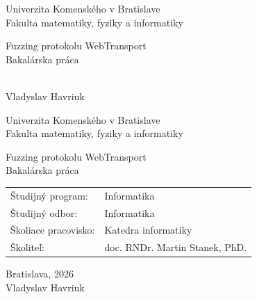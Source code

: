 \documentclass[12pt, twoside, openany]{book}
\def\mfrok{2026}
\def\mfnazov{Fuzzing protokolu WebTransport}
\def\mftyp{Bakalárska práca}
\def\mfautor{Vladyslav Havriuk}
\def\mfskolitel{doc. RNDr. Martin Stanek, PhD.}
\def\mfmiesto{Bratislava, \mfrok}
\def\mfodbor{ Informatika }
\def\program{ Informatika }
\def\mfpracovisko{ Katedra informatiky }
\begin{document}
     
\frontmatter
\pagestyle{empty}


\begin{center}
\sc\large
Univerzita Komenského v Bratislave\\
Fakulta matematiky, fyziky a informatiky

\vfill

{\LARGE\mfnazov}\\
\mftyp
\end{center}

\vfill

{\sc\large 
\noindent \mfrok\\
\mfautor
}

\cleardoublepage



\noindent

\begin{center}
\sc  
\large
Univerzita Komenského v Bratislave\\
Fakulta matematiky, fyziky a informatiky

\vfill

{\LARGE\mfnazov}\\
\mftyp
\end{center}

\vfill

\noindent
\begin{tabular}{ll}
Študijný program: & \program \\
Študijný odbor: & \mfodbor \\
Školiace pracovisko: & \mfpracovisko \\
Školiteľ: & \mfskolitel \\
\end{tabular}

\vfill


\noindent \mfmiesto\\
\mfautor

\cleardoublepage



\newpage 
\setcounter{page}{3}

\end{document}
